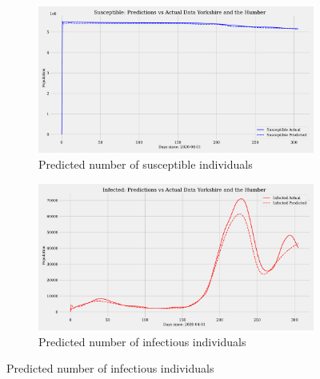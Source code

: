 \documentclass[12pt]{article}
\begin{document}
\begin{figure}
    \centering
    \begin{subfigure}[t]{0.45\textwidth}
        \includegraphics[width=\textwidth]{images/pinn/S_predictions_Yorkshire and the Humber.pdf}
        \caption{Predicted number of susceptible individuals}
        \label{fig:S_predictions_Yorkshire and the Humber}
    \end{subfigure}
    \hfill %
    \begin{subfigure}[t]{0.45\textwidth}
        \includegraphics[width=\textwidth]{images/pinn/I_predictions_Yorkshire and the Humber.pdf}
        \caption{Predicted number of infectious individuals}
        \label{fig:I_predictions_Yorkshire and the Humber}
    \end{subfigure}

    \vspace{0.5cm}


\end{figure}
\end{document}
